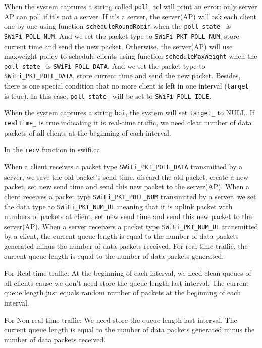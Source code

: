 \documentclass{article}
\begin{document}
When the system captures a string called  \lstinline|poll|, tcl will print an error: only server AP can poll if it's not a server. If it's a server, the server(AP) will ask each client one by one using function \lstinline|scheduleRoundRobin| when the \lstinline|poll_state_| is  \lstinline|SWiFi_POLL_NUM|. And we set the packet type to \lstinline|SWiFi_PKT_POLL_NUM|, store current time and send the new packet. Otherwise, the server(AP) will use maxweight policy to schedule clients using function \lstinline|scheduleMaxWeight| when the \lstinline|poll_state_| is  \lstinline|SWiFi_POLL_DATA|. And we set the packet type to \lstinline|SWiFi_PKT_POLL_DATA|, store current time and send the new packet. Besides, there is one special condition that no more client is left in one interval (\lstinline|target_| is true). In this case, \lstinline|poll_state_| will be set to \lstinline|SWiFi_POLL_IDLE|.


When the system captures a string \lstinline|boi|, the system will set \lstinline|target_| to NULL. If  \lstinline|realtime_|  is true indicating it is real-time traffic, we need clear number of data packets of all clients at the beginning of each interval. 

In the  \lstinline|recv| function in swifi.cc

When a client receives a packet type \lstinline|SWiFi_PKT_POLL_DATA| transmitted by a server, we save the old packet's send time, discard the old packet, create a new packet, set new send time and send this new packet to the server(AP). 
When a client receives a packet type \lstinline|SWiFi_PKT_POLL_NUM| transmitted by a server, we set the data type to \lstinline|SWiFi_PKT_NUM_UL| meaning that it is uplink packet with numbers of packets at client, set new send time and send this new packet to the server(AP).
When a server receivers  a packet type \lstinline|SWiFi_PKT_NUM_UL| transmitted by a client, the current queue length is equal to the number of data packets generated minus the number of data packets received. For real-time traffic, the current queue length is equal to the number of data packets generated.  

For Real-time traffic: At the beginning of each interval, we need clean queues of all clients cause we don't need store the queue length last interval. The current queue length just equals random number of packets at the beginning of each interval. 

For Non-real-time traffic: We need store the queue length last interval. The current queue length is equal to the number of data packets generated minus the number of data packets received. 
\end{document}

